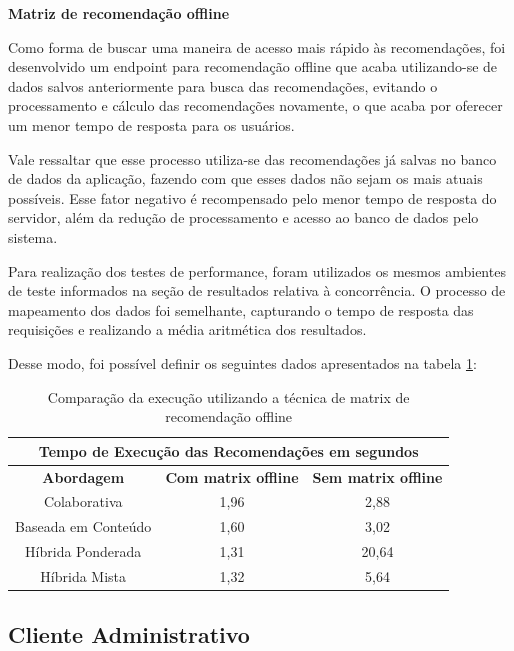 \textbf{Matriz de recomendação offline}

Como forma de buscar uma maneira de acesso mais rápido às recomendações, foi desenvolvido um endpoint para recomendação offline que acaba utilizando-se de dados salvos anteriormente para busca das recomendações, evitando o processamento e cálculo das recomendações novamente, o que acaba por oferecer um menor tempo de resposta para os usuários.

Vale ressaltar que esse processo utiliza-se das recomendações já salvas no banco de dados da aplicação, fazendo com que esses dados não sejam os mais atuais possíveis. Esse fator negativo é recompensado pelo menor tempo de resposta do servidor, além da redução de processamento e acesso ao banco de dados pelo sistema.

Para realização dos testes de performance, foram utilizados os mesmos ambientes de teste informados na seção de resultados relativa à concorrência. O processo de mapeamento dos dados foi semelhante, capturando o tempo de resposta das requisições e realizando a média aritmética dos resultados.

Desse modo, foi possível definir os seguintes dados apresentados na tabela \ref{tableref:execucaoRecomendacaoMatrix}:

\begin{table}[H]
\centering
\begin{tabular}{|c|c|c|}
\hline
\multicolumn{3}{|c|}{\textbf{Tempo de Execução das Recomendações em segundos}}  \\ \hline
\textbf{Abordagem}  & \textbf{Com matrix offline} & \textbf{Sem matrix offline} \\ \hline
Colaborativa        & 1,96                        & 2,88                        \\ \hline
Baseada em Conteúdo & 1,60                        & 3,02                        \\ \hline
Híbrida Ponderada   & 1,31                        & 20,64                       \\ \hline
Híbrida Mista       & 1,32                        & 5,64                        \\ \hline
\end{tabular}
\caption{Comparação da execução utilizando a técnica de matrix de recomendação offline}
\label{tableref:execucaoRecomendacaoMatrix}
\end{table}

\subsection{Cliente Administrativo}

